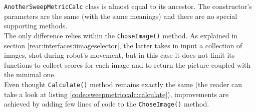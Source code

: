 \texttt{AnotherSweepMetricCalc} class is almost equal to its ancestor. The
constructor's parameters are the same (with the same meanings)
and there are no special supporting methods.
\\
The only difference relies within the \texttt{ChoseImage()} method. As
explained in section \ref{rear:interfaces:iimageselector}, the latter
takes in input a collection of images, shot during robot's movement,
but in this case it does not limit its functions to collect scores
for each image and to return the picture coupled with the minimal one. 
\\
Even thought \texttt{Calculate()} method remains exactly the same
(the reader can take a look at listing
\ref{code:sweepmetriccalc:calculate}), improvements are
achieved by adding few lines of code to the \texttt{ChoseImage()}
method.
\\
